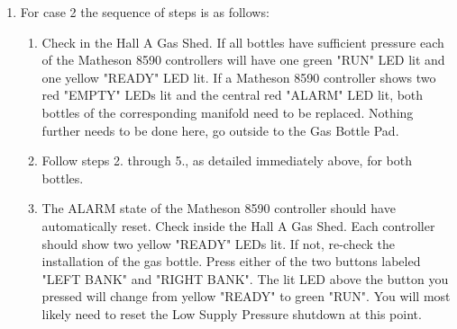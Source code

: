 {\begin{enumerate}
\begin{enumerate}
    \item Visually verify that the corresponding pressure gauge on 
the flex line is showing a low pressure. A low pressure is not 
necessarily zero. Close the bottle valve for the empty bottle.

    \item Disconnect the empty bottle from the high-pressure flex-line. 
The in-line check-valves will prevent gas escaping from the manifold. 
Replace the bottle's cap, and move the empty bottle to the EMPTIES 
storage rack. Note that ethane bottle fittings, type CGA-350, have 
left-handed threads.

    \item Place a full bottle of gas in the on-line rack, remove the 
bottle cap, and connect the bottle to the flex-line.

    \item Open the new bottle's valve, check for leaks at the bottle 
fitting. The corresponding pressure gauge should now read full bottle pressure.

    \item The ALARM state of the Matheson 8590 controller should have 
automatically reset. Check inside the Hall A Gas Shed. Each controller 
should show a green "RUN" and yellow "READY" LED lit. If not, 
re-check the installation of the gas bottle.
\end{enumerate}

\item For case 2 the sequence of steps is as follows:
\begin{enumerate}
    \item  Check in the Hall A Gas Shed. If all bottles have sufficient 
pressure each of the Matheson 8590 controllers will 
have one green "RUN" LED lit and one yellow "READY" LED lit. 
If a Matheson 8590 controller shows two red "EMPTY" LEDs lit and 
the central red "ALARM" LED lit, both bottles of the corresponding 
manifold need to be replaced. Nothing further 
needs to be done here, go outside to the Gas Bottle Pad. 

    \item Follow steps 2. through 5., as detailed immediately above, for 
both bottles.

    \item The ALARM state of the Matheson 8590 controller should have 
automatically reset. Check inside the Hall A Gas Shed. Each 
controller should show two yellow "READY" LEDs lit. If not, re-check 
the installation of the gas bottle. Press either of the two buttons 
labeled "LEFT BANK" and "RIGHT BANK". The lit LED above the button 
you pressed will change from yellow "READY" to green "RUN". You will 
most likely need to reset the Low Supply Pressure shutdown at this point.
\end{enumerate}
\end{enumerate}


}
